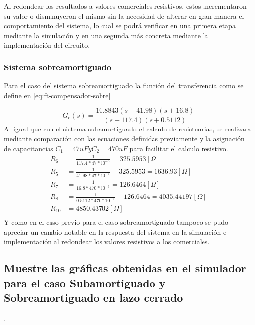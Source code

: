 \documentclass[conference]{IEEEtran}
\begin{document}
	 Al redondear los resultados a valores comerciales resistivos, estos incrementaron su valor o disminuyeron el mismo sin la necesidad de alterar en gran manera el comportamiento del sistema, lo cual se podrá verificar en una primera etapa mediante la simulación y en una segunda más concreta mediante la implementación del circuito.
	 
	 \subsubsection{\textbf{Sistema sobreamortiguado}}
	 
	 Para el caso del sistema sobreamortiguado la función del transferencia como se define en \ref{eq:ft-compensador-sobre}
	 
	 \begin{equation}
	 	G_c(s) = \frac{10.8843(s + 41.98)(s + 16.8)}{(s + 117.4)(s + 0.5112)}
	 	\label{eq:ft-compensador-sobre}
	 \end{equation}
	 Al igual que con el sistema subamortiguado el calculo de resistencias, se realizara mediante comparación con las ecuaciones definidas previamente y la asignación de capacitancias $C_1 = 47uF y C_2 = 470uF$ para facilitar el calculo resistivo.
	 \begin{align}
	 	R_6 &= \frac{1}{117.4*47*10^{-6}} = 325.5953 [\Omega] \\
	 	R_5 &= \frac{1}{41.98*47*10^{-6}} - 325.5953 = 1636.93 [\Omega] \\
	 	R_7 &= \frac{1}{16.8*470*10^{-6}} = 126.6464 [\Omega] \\
	 	R_8 &= \frac{1}{0.5112*470*10^{-6}} - 126.6464 = 4035.44197 [\Omega] \\
	 	R_{10} &=  4850.43702 [\Omega] \\
	 \end{align}
	 Y como en el caso previo para el caso sobreamortiguado tampoco se pudo apreciar un cambio notable en la respuesta del sistema en la simulación e implementación al redondear los valores resistivos a los comerciales.
	 
	 \subsection{\textbf{Muestre las gráficas obtenidas en el simulador para el caso Subamortiguado y Sobreamortiguado en lazo cerrado}}.
	 
\end{document}

